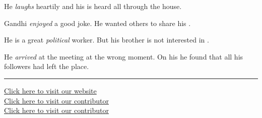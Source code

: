 \documentclass[11pt,a4paper]{article}
\begin{document}
\begin{parts}
  \item He   \textit{laughs} heartily and his \underline{\hspace{4cm}} is heard all through the house.
  \item Gandhi   \textit{enjoyed} a good joke. He wanted others to share his \underline{\hspace{4cm}}.
  \item He is a great   \textit{political} worker. But his brother is not interested in \underline{\hspace{4cm}}.
  \item He   \textit{arrived} at the meeting at the wrong moment. On his \underline{\hspace{4cm}} he found that all his followers had left the place.
\end{parts}

\vfill
\rule{\linewidth}{0.4pt}

\begin{center}\small
\href{https://bhu-exam.vercel.app/}{Click here to visit our website}\\[4pt]
\href{https://me-aryan.vercel.app/}{Click here to visit our contributor}\\[4pt]
\href{https://quashan-me.vercel.app/}{Click here to visit our contributor}
\end{center}
\end{document}
